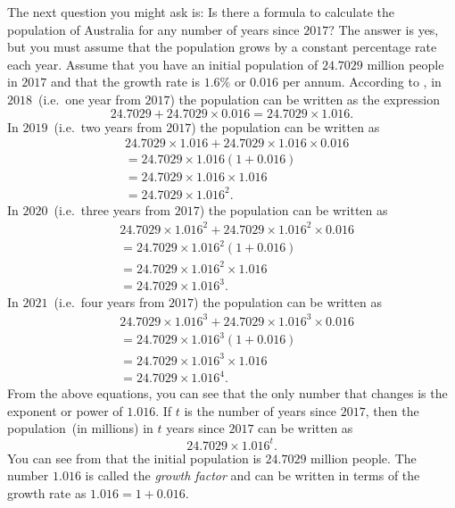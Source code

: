 \documentclass[a4paper,oneside,12pt]{article}
\begin{document}
The next question you might ask is:  Is there a formula to calculate
the population of Australia for any number of years since $2017$?  The
answer is yes, but you must assume that the population grows by a
constant percentage rate each year.  Assume that you have an initial
population of $24.7029$ million people in $2017$ and that the growth
rate is $1.6\%$ or $0.016$ per annum.  According to
, in
$2018$~(i.e.~one year from $2017$) the population can be written as
the expression
\[
24.7029 + 24.7029 \times 0.016
=
24.7029 \times 1.016.
\]
In $2019$~(i.e.~two years from $2017$) the population can be written
as
\begin{align*}
&24.7029 \times 1.016 + 24.7029 \times 1.016 \times 0.016 \\[4pt]
&=
24.7029 \times 1.016 (1 + 0.016) \\[4pt]
&=
24.7029 \times 1.016 \times 1.016 \\[4pt]
&=
24.7029 \times 1.016^2.
\end{align*}
In $2020$~(i.e.~three years from $2017$) the population can be written
as
\begin{align*}
&24.7029 \times 1.016^2 + 24.7029 \times 1.016^2 \times 0.016 \\[4pt]
&=
24.7029 \times 1.016^2 (1 + 0.016) \\[4pt]
&=
24.7029 \times 1.016^2 \times 1.016 \\[4pt]
&=
24.7029 \times 1.016^3.
\end{align*}
In $2021$~(i.e.~four years from $2017$) the population can be written
as
\begin{align*}
&24.7029 \times 1.016^3 + 24.7029 \times 1.016^3 \times 0.016 \\[4pt]
&=
24.7029 \times 1.016^3 (1 + 0.016) \\[4pt]
&=
24.7029 \times 1.016^3 \times 1.016 \\[4pt]
&=
24.7029 \times 1.016^4.
\end{align*}
From the above equations, you can see that the only number that
changes is the exponent or power of $1.016$.  If $t$ is the number of
years since $2017$, then the population~(in millions) in $t$ years
since $2017$ can be written as
\begin{equation}
\label{eqn:Australian_population_formula}
24.7029 \times 1.016^t.
\end{equation}
You can see from  that
the initial population is $24.7029$ million people.  The number
$1.016$ is called the \emph{growth factor} and can be written in terms
of the growth rate as $1.016 = 1 + 0.016$.
\end{document}
